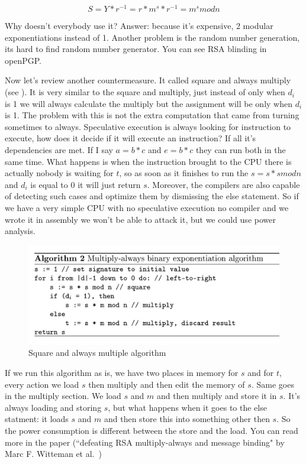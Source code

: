 \[S = Y*r^{-1} = r*m^s*r^{-1} = m^s mod n\]

Why doesn't everybody use it? Answer: because it's expensive, 2 modular
exponentiations instead of 1. Another problem is the random number generation,
its hard to find random number generator. You can see RSA blinding in openPGP. 

Now let's review another countermeasure. It called square and always multiply
(see ). It is very similar to the square and multiply, just
instead of only when \(d_i\) is 1 we will always calculate the multiply but the
assignment will be only when \(d_i\) is 1. The problem with this is not the
extra computation that came from turning sometimes to always. Speculative
execution is always looking for instruction to execute, how does it decide if it
will execute an instruction? If all it's dependencies are met. If I say \(a =
b*c\) and \(e = b*c\) they can run both in the same time. What happens is when
the instruction brought to the CPU there is actually nobody is waiting for $t$, so
as soon as it finishes to run the \(s =s *s mod n\) and \(d_i\) is equal to 0 it
will just return $s$. Moreover, the compilers are also capable of detecting such
cases and optimize them by dismissing the else statement. So if we have a very
simple CPU with no speculative execution no compiler and we wrote it in assembly
we won't be able to attack it, but we could use power analysis.

\begin{figure}[!ht]
    \centering
    \includegraphics[scale=0.15]{images/saama.png}
    \caption{Square and always multiple algorithm} \label{fig:saama}
\end{figure}

If we run this algorithm as is, we have two places in memory for $s$ and for $t$,
every action we load $s$ then multiply and then edit the memory of $s$. Same goes in
the multiply section. We load $s$ and $m$ and then multiply and store it in $s$. It's
always loading and storing $s$, but what happens when it goes to the else statment:
it loads $s$ and $m$ and then store this into something other then $s$. So the power
consumption is different between the store and the load. You can read more in
the paper (``defeating RSA multiply-always and message binding" by Marc F.
Witteman et al.~\cite{witteman2011defeating})

